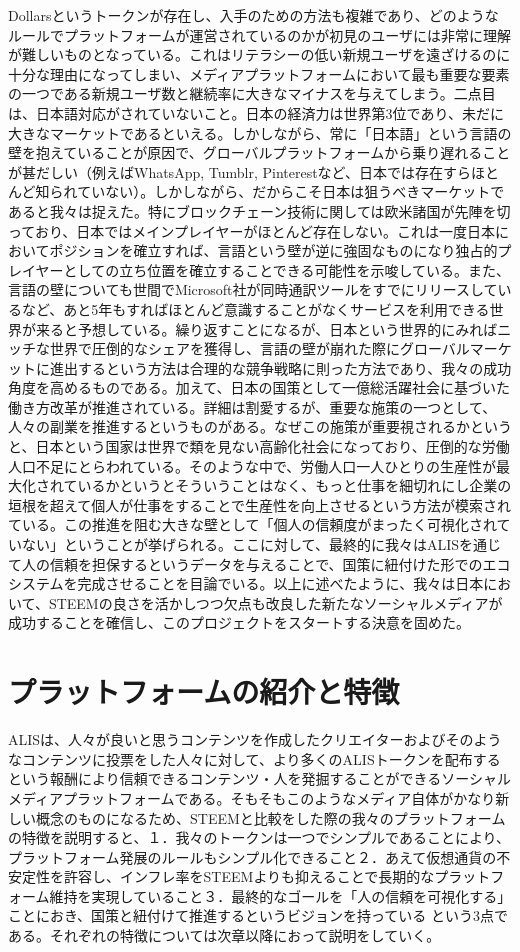 \documentclass{jsarticle}
\begin{document}
Dollarsというトークンが存在し、入手のための方法も複雑であり、どのようなルールでプラットフォームが運営されているのかが初見のユーザには非常に理解が難しいものとなっている。これはリテラシーの低い新規ユーザを遠ざけるのに十分な理由になってしまい、メディアプラットフォームにおいて最も重要な要素の一つである新規ユーザ数と継続率に大きなマイナスを与えてしまう。二点目は、日本語対応がされていないこと。日本の経済力は世界第3位であり、未だに大きなマーケットであるといえる。しかしながら、常に「日本語」という言語の壁を抱えていることが原因で、グローバルプラットフォームから乗り遅れることが甚だしい（例えばWhatsApp, Tumblr, Pinterestなど、日本では存在すらほとんど知られていない）。しかしながら、だからこそ日本は狙うべきマーケットであると我々は捉えた。特にブロックチェーン技術に関しては欧米諸国が先陣を切っており、日本ではメインプレイヤーがほとんど存在しない。これは一度日本においてポジションを確立すれば、言語という壁が逆に強固なものになり独占的プレイヤーとしての立ち位置を確立することできる可能性を示唆している。また、言語の壁についても世間でMicrosoft社が同時通訳ツールをすでにリリースしているなど、あと5年もすればほとんど意識することがなくサービスを利用できる世界が来ると予想している。繰り返すことになるが、日本という世界的にみればニッチな世界で圧倒的なシェアを獲得し、言語の壁が崩れた際にグローバルマーケットに進出するという方法は合理的な競争戦略に則った方法であり、我々の成功角度を高めるものである。加えて、日本の国策として一億総活躍社会に基づいた働き方改革が推進されている。詳細は割愛するが、重要な施策の一つとして、人々の副業を推進するというものがある。なぜこの施策が重要視されるかというと、日本という国家は世界で類を見ない高齢化社会になっており、圧倒的な労働人口不足にとらわれている。そのような中で、労働人口一人ひとりの生産性が最大化されているかというとそういうことはなく、もっと仕事を細切れにし企業の垣根を超えて個人が仕事をすることで生産性を向上させるという方法が模索されている。この推進を阻む大きな壁として「個人の信頼度がまったく可視化されていない」ということが挙げられる。ここに対して、最終的に我々はALISを通じて人の信頼を担保するというデータを与えることで、国策に紐付けた形でのエコシステムを完成させることを目論でいる。以上に述べたように、我々は日本において、STEEMの良さを活かしつつ欠点も改良した新たなソーシャルメディアが成功することを確信し、このプロジェクトをスタートする決意を固めた。
\section{プラットフォームの紹介と特徴}
ALISは、人々が良いと思うコンテンツを作成したクリエイターおよびそのようなコンテンツに投票をした人々に対して、より多くのALISトークンを配布するという報酬により信頼できるコンテンツ・人を発掘することができるソーシャルメディアプラットフォームである。そもそもこのようなメディア自体がかなり新しい概念のものになるため、STEEMと比較をした際の我々のプラットフォームの特徴を説明すると、１．我々のトークンは一つでシンプルであることにより、プラットフォーム発展のルールもシンプル化できること２．あえて仮想通貨の不安定性を許容し、インフレ率をSTEEMよりも抑えることで長期的なプラットフォーム維持を実現していること３．最終的なゴールを「人の信頼を可視化する」ことにおき、国策と紐付けて推進するというビジョンを持っている という3点である。それぞれの特徴については次章以降におって説明をしていく。
\end{document}
